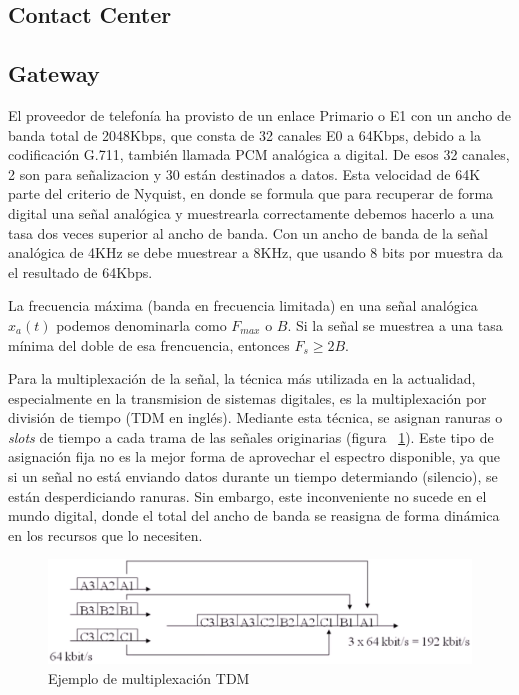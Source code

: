 \documentclass[a4paper, 12pt]{book}
\begin{document}
\subsection{Contact Center}
\label{sec:contact_center}


\subsection{Gateway}
\label{sec:gateway}

El proveedor de telefonía ha provisto de un enlace Primario o E1 con un ancho de banda total de 2048Kbps, que consta de 32 canales E0 a 64Kbps, debido a la codificación G.711, también llamada PCM analógica a digital. De esos 32 canales, 2 son para señalizacion y 30 están destinados a datos. 
Esta velocidad de 64K parte del criterio de Nyquist, en donde se formula que para recuperar de forma digital una señal analógica y muestrearla correctamente debemos hacerlo a una tasa dos veces superior al ancho de banda. 
Con un ancho de banda de la señal analógica de 4KHz se debe muestrear a 8KHz, que usando 8 bits por muestra da el resultado de 64Kbps. 

La frecuencia máxima (banda en frecuencia limitada) en una señal analógica $x_{a}(t)$ podemos denominarla como $F_{max}$  o $B$. Si la señal se muestrea a una tasa mínima del doble de esa frencuencia, entonces $F_{s} \geq 2B$.

Para la multiplexación de la señal, la técnica más utilizada en la actualidad, especialmente en la transmision de sistemas digitales, es la multiplexación por división de tiempo (TDM en inglés). Mediante esta técnica, se asignan ranuras o \emph{slots} de tiempo a cada trama de las señales originarias (figura ~\ref{figura:fig_tdm}). Este tipo de asignación fija no es la mejor forma de aprovechar el espectro disponible, ya que si un señal no está enviando datos durante un tiempo determiando (silencio), se están desperdiciando ranuras. Sin embargo, este inconveniente no sucede en el mundo digital, donde el total del ancho de banda se reasigna de forma dinámica en los recursos que lo necesiten.

\begin{figure}
  \centering
  \includegraphics[scale=0.7]{img/fig_tdm}
  \caption{Ejemplo de multiplexación TDM}
  \label{figura:fig_tdm}
\end{figure}
\end{document}
